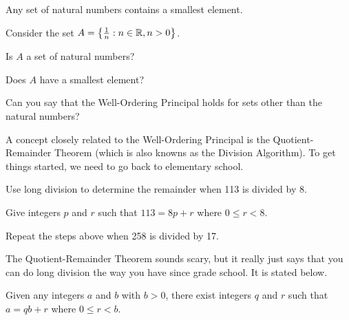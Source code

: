 \begin{axiom}	Any set of natural numbers contains a smallest element.
\end{axiom}
	\begin{question}[resume]
	\item Consider the set $A=\left\{\frac{1}{n} : n\in \mathbb{R}, n > 0\right\}$.  
		\begin{qpart}
		\item Is $A$ a set of natural numbers?  
		\vspace{.5in}
		\item Does $A$ have a smallest element?  
		\vspace{.5in}
		\item Can you say that the Well-Ordering Principal holds for sets other than the natural numbers?
	\vspace{1in}
	\end{qpart}
	\end{question}
	


	\begin{question}[resume]
	\item A concept closely related to the Well-Ordering Principal is the Quotient-Remainder Theorem (which is also knowns as the Division Algorithm).  To get things started, we need to go back to elementary school.
	\begin{qpart}
		\item Use long division to determine the remainder when 113 is divided by 8.
		
		\vspace{2in}
		
		\item Give integers $p$ and $r$ such that $113=8p+r$ where $0 \leq r<8$.
		
		\vspace{1.5in}
		
	\end{qpart}
	\item Repeat the steps above when 258 is divided by 17.
	\vspace{2in}
	
	\end{question}
	
\noindent The Quotient-Remainder Theorem sounds scary, but it really just says that you can do long division the way you have since grade school. It is stated below.

\begin{axiom}  Given any integers $a$ and $b$ with $b>0$, there exist integers $q$ and $r$ such that $a=qb+r$ where $0 \leq r < b$.
\end{axiom}

